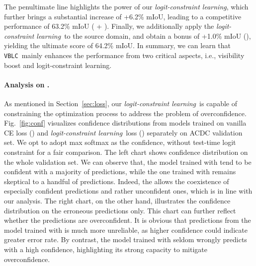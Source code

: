 \documentclass[letterpaper]{article} \usepackage{aaai23}  \usepackage{times}  \usepackage{helvet}  \usepackage{courier}  \usepackage[hyphens]{url}  \usepackage{graphicx} \urlstyle{rm} \def\UrlFont{\rm}  \usepackage{natbib}  \usepackage{caption} \frenchspacing  \setlength{\pdfpagewidth}{8.5in}  \setlength{\pdfpageheight}{11in}  \usepackage{algorithm}
\newcommand{\method}{\texttt{VBLC}~}
\newcommand{\lossModuleName}{\textit{logit-constraint learning}}
\begin{document}
The penultimate line highlights the power of our \lossModuleName, which further brings a substantial increase of +6.2\% mIoU, leading to a competitive performance of 63.2\% mIoU ( + ). Finally, we additionally apply the \lossModuleName~to the source domain, and obtain a bonus of +1.0\% mIoU (), yielding the ultimate score of 64.2\% mIoU. 
In summary, we can learn that \method mainly enhances the performance from two critical aspects, i.e., visibility boost and logit-constraint learning.

\begin{table}[t]
  \centering
  \caption{Ablation study on \textbf{Cityscapes  ACDC semantic segmentation task}.}
  \label{table:ablation}
\end{table}

\paragraph{Analysis on .} As mentioned in Section~\ref{sec:loss}, our \lossModuleName~is capable of constraining the optimization process to address the problem of overconfidence. Fig.~\ref{fig:conf} visualizes confidence distributions from models trained on vanilla CE loss () and \lossModuleName~loss () separately on ACDC validation set. We opt to adopt max softmax as the confidence, without test-time logit constraint for a fair comparison. The left chart shows confidence distribution on the whole validation set. We can observe that, the model trained with  tend to be confident with a majority of predictions, while the one trained with  remains skeptical to a handful of predictions. Indeed, the  allows the coexistence of especially confident predictions and rather unconfident ones, which is in line with our analysis. The right chart, on the other hand, illustrates the confidence distribution on the erroneous predictions only. This chart can further reflect whether the predictions are overconfident. It is obvious that predictions from the model trained with  is much more unreliable, as higher confidence could indicate greater error rate. By contrast, the model trained with  seldom wrongly predicts with a high confidence, highlighting its strong capacity to mitigate overconfidence.
\end{document}
